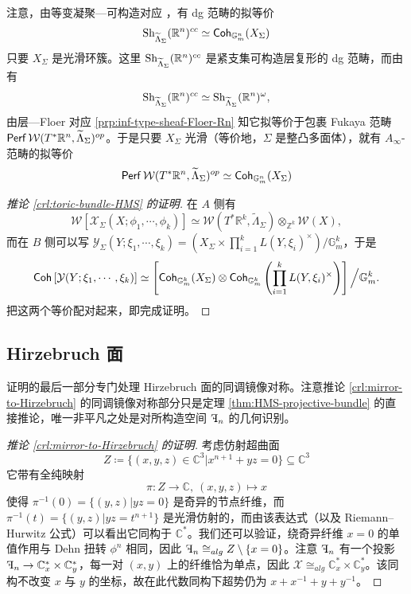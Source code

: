 注意，由等变凝聚—可构造对应 \cite{FLTZ11}，有 dg 范畴的拟等价 \[
    \operatorname{Sh}_{\widetilde{\Lambda}_{\Sigma}} (\mathbb{R}^n)^{cc}\simeq\operatorname{\mathsf{Coh}}_{\mathbb{G}_m^n} (X_{\Sigma})
\]只要 $X_{\Sigma}$ 是光滑环簇。这里 $\operatorname{Sh}_{\widetilde{\Lambda}_{\Sigma}} (\mathbb{R}^n)^{cc}$ 是紧支集可构造层复形的 dg 范畴，而由 \cite[Lemma 4.18]{GPS24M} 有 \[
    \operatorname{Sh}_{\widetilde{\Lambda}_{\Sigma}} (\mathbb{R}^n)^{cc}\simeq\operatorname{Sh}_{\widetilde{\Lambda}_{\Sigma}} (\mathbb{R}^n)^{\omega},
\]由层—Floer 对应 \ref{prp:inf-type-sheaf-Floer-Rn} 知它拟等价于包裹 Fukaya 范畴 $\operatorname{\mathsf{Perf}}\mathcal{W} (T^{\ast}\mathbb{R}^n,\widetilde{\Lambda}_{\Sigma})^{op}$。于是只要 $X_{\Sigma}$ 光滑（等价地，$\Sigma$ 是整凸多面体），就有 $A_{\infty}$-范畴的拟等价 \[
    \operatorname{\mathsf{Perf}}\mathcal{W} (T^{\ast}\mathbb{R}^n,\widetilde{\Lambda}_{\Sigma})^{op}\simeq\operatorname{\mathsf{Coh}}_{\mathbb{G}_m^n} (X_{\Sigma})
\]
\begin{proof}[推论 \ref{crl:toric-bundle-HMS} 的证明]
    在 $A$ 侧有 \[
        \mathcal{W}\left[\mathcal{X}_{\Sigma} (X;\phi_1,\dotsb ,\phi_k)\right]\simeq\mathcal{W} (T^{\ast}\mathbb{R}^k,\widetilde{\Lambda}_{\Sigma})\otimes_{\mathbb{Z}^k}\mathcal{W} (X),
    \]而在 $B$ 侧可以写 $\mathcal{Y}_{\Sigma} (Y;\xi_1,\dotsb ,\xi_k)=\left(X_{\Sigma}\times \prod_{i=1}^k L(Y,\xi_i)^{\times}\right)/\mathbb{G}_m^k$，于是 \[
        \operatorname{\mathsf{Coh}}\left[\mathcal{Y} (Y;\xi_1,\dotsb ,\xi_k)\right]\simeq\left[\operatorname{\mathsf{Coh}}_{\mathbb{G}_m^k} (X_{\Sigma})\otimes\operatorname{\mathsf{Coh}}_{\mathbb{G}_m^k} \left(\prod_{i=1}^kL(Y,\xi_i)^{\times}\right)\right]\Big/\mathbb{G}_m^k.
    \]
把这两个等价配对起来，即完成证明。
\end{proof}

\subsection{Hirzebruch 面}

证明的最后一部分专门处理 Hirzebruch 面的同调镜像对称。注意推论 \ref{crl:mirror-to-Hirzebruch} 的同调镜像对称部分只是定理 \ref{thm:HMS-projective-bundle} 的直接推论，唯一非平凡之处是对所构造空间 $\rF_n$ 的几何识别。

\begin{proof}[推论 \ref{crl:mirror-to-Hirzebruch} 的证明]
    考虑仿射超曲面 \[
            Z\coloneqq\{(x,y,z)\in\mathbb{C}^3\vert x^{n+1}+yz=0\}\subseteq\mathbb{C}^3
        \]它带有全纯映射 \[
            \pi\colon Z\to\mathbb{C},\ (x,y,z)\mapsto x
        \]使得 $\pi^{-1} (0)=\{(y,z)\vert yz=0\}$ 是奇异的节点纤维，而 $\pi^{-1} (t)=\{(y,z)\vert yz =t^{n+1}\}$ 是光滑仿射的，而由该表达式（以及 Riemann--Hurwitz 公式）可以看出它同构于 $\mathbb{C}^{\ast}$。我们还可以验证，绕奇异纤维 $x=0$ 的单值作用与 Dehn 扭转 $\phi^n$ 相同，因此 $\rF_n\cong_{alg} Z\setminus\{x=0\}$。注意 $\rF_n$ 有一个投影 $\rF_n\to\mathbb{C}_x^{\ast}\times\mathbb{C}_y^{\ast}$，每一对 $(x,y)$ 上的纤维恰为单点，因此 $\mathcal{X}\cong_{alg}\mathbb{C}_x^{\ast}\times\mathbb{C}_y^{\ast}$。该同构不改变 $x$ 与 $y$ 的坐标，故在此代数同构下超势仍为 $x+x^{-1} +y+y^{-1}$。
\end{proof}

